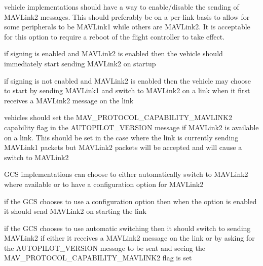 \begin{DoxyItemize}
\item vehicle implementations should have a way to enable/disable the sending of M\+A\+V\+Link2 messages. This should preferably be on a per-\/link basis to allow for some peripherals to be M\+A\+V\+Link1 while others are M\+A\+V\+Link2. It is acceptable for this option to require a reboot of the flight controller to take effect.
\item if signing is enabled and M\+A\+V\+Link2 is enabled then the vehicle should immediately start sending M\+A\+V\+Link2 on startup
\item if signing is not enabled and M\+A\+V\+Link2 is enabled then the vehicle may choose to start by sending M\+A\+V\+Link1 and switch to M\+A\+V\+Link2 on a link when it first receives a M\+A\+V\+Link2 message on the link
\item vehicles should set the M\+A\+V\+\_\+\+P\+R\+O\+T\+O\+C\+O\+L\+\_\+\+C\+A\+P\+A\+B\+I\+L\+I\+T\+Y\+\_\+\+M\+A\+V\+L\+I\+N\+K2 capability flag in the A\+U\+T\+O\+P\+I\+L\+O\+T\+\_\+\+V\+E\+R\+S\+I\+ON message if M\+A\+V\+Link2 is available on a link. This should be set in the case where the link is currently sending M\+A\+V\+Link1 packets but M\+A\+V\+Link2 packets will be accepted and will cause a switch to M\+A\+V\+Link2
\item G\+CS implementations can choose to either automatically switch to M\+A\+V\+Link2 where available or to have a configuration option for M\+A\+V\+Link2
\item if the G\+CS chooses to use a configuration option then when the option is enabled it should send M\+A\+V\+Link2 on starting the link
\item if the G\+CS chooses to use automatic switching then it should switch to sending M\+A\+V\+Link2 if either it receives a M\+A\+V\+Link2 message on the link or by asking for the A\+U\+T\+O\+P\+I\+L\+O\+T\+\_\+\+V\+E\+R\+S\+I\+ON message to be sent and seeing the M\+A\+V\+\_\+\+P\+R\+O\+T\+O\+C\+O\+L\+\_\+\+C\+A\+P\+A\+B\+I\+L\+I\+T\+Y\+\_\+\+M\+A\+V\+L\+I\+N\+K2 flag is set 
\end{DoxyItemize}